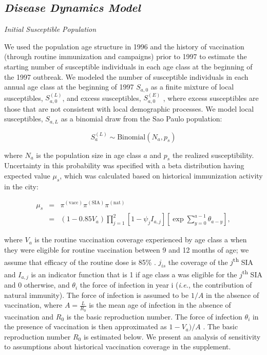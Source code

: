 \subsection{\texorpdfstring{\emph{Disease Dynamics
Model}}{Disease Dynamics Model}}\label{disease-dynamics-model}

\emph{Initial Susceptible Population}

We used the population age structure in 1996 and the history of vaccination (through routine immunization and campaigns) prior to 1997 to estimate the starting number of susceptible individuals in each age class at the beginning of the 1997 outbreak.  We modeled the number of susceptible individuals in each annual age class at the beginning of 1997 \(S_{a,0}\) as a finite mixture of local susceptibles, \(S_{a,0}^{(L)}\), and excess susceptibles, \(S_{a,0}^{(E)}\) , where excess susceptibles are those that are not consistent with local demographic processes.  We model local susceptibles, \(S_{a,L}\) as a binomial draw from the Sao Paulo population:

\[S_a^{(L)} \sim \text{Binomial}(N_a, p_s)\]

where \(N_a\) is the population size in age class \(a\) and \(p_s\) the realized susceptibility. Uncertainty in this probability was specified with a beta distribution having expected value \(\mu_s\), which was calculated based on historical immunization activity in the city:

\begin{eqnarray}
\mu_s &=& \pi^{(\text{vacc})} \pi^{(\text{SIA})}\pi^{(\text{nat})} \\
&=& (1- 0.85 V_a) \prod_{j=1}^2 \left[1- \psi_j I_{a,j} \right] \left[\exp \sum_{y=0}^{a-1} \theta_{a-y} \right],
\end{eqnarray}

where \(V_a\) is the routine vaccination coverage experienced by age class a when they were eligible for routine vaccination between 9 and 12 months of age; we assume that efficacy of the routine dose is 85\% \cite{Uzicanin_2011}.  \(j_{is}\) the coverage of the \(j\)\textsuperscript{th} SIA and \(I_{a,j}\) is an indicator function that is 1 if age class a was eligible for the \(j\)\textsuperscript{th} SIA and 0 otherwise, and \(\theta_i\) the force of infection in year i (\emph{i.e.}, the contribution of natural immunity).  The force of infection is assumed to be \(1/A\) in the absence of vaccination, where \(A=\frac{L}{R_0}\) \cite{Anderson_1981} is the mean age of infection in the absence of vaccination and \(R_0\) is the basic reproduction number. The force of infection \(\theta_i\) in the presence of vaccination is then approximated as \(1-V_a)/A\) \cite{Anderson_1981}.  The basic reproduction number \(R_0\) is estimated below.  We present an analysis of sensitivity to assumptions about historical vaccination coverage in the supplement.

